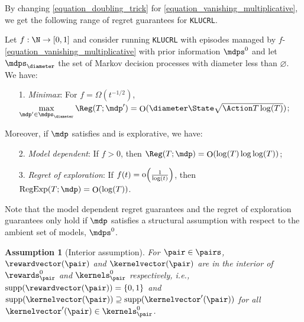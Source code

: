 \documentclass[preprint,cleveref,12pt]{colt2025}
\newenvironment{blackblock}{
    \begin{tcolorbox}[
        enhanced,
        breakable,
        colback=black!10,
        leftrule=1mm,
        toprule=0pt,
        bottomrule=0pt,
        rightrule=0pt,
        arc=0pt,
        before skip=1em plus 2pt,
        after skip=1em plus 2pt,
    ]
}{
    \end{tcolorbox}
}
\newtheorem{assumption}{Assumption}
\DeclarePairedDelimiter{\braces}{\{}{\}}	%
\DeclarePairedDelimiter{\parens}{(}{)}	%
\DeclareMathOperator*{\oh}{\mathrm{o}}
\DeclareMathOperator*{\OH}{\mathrm{O}}
\def\model{\mdp}
\def\models{\mdps}
\def\kernel{\kernelvector}
\def\reward{\rewardvector}
\DeclareMathOperator{\RegExp}{\mathrm{RegExp}}
\begin{document}
    By changing \eqref{equation_doubling_trick} for \eqref{equation_vanishing_multiplicative}, we get the following range of regret guarantees for \texttt{KLUCRL}.

    \begin{blackblock}
    \begin{theorem}
    \label{theorem_main}
        Let $f : \N \to [0, 1]$ and consider running \texttt{KLUCRL} with episodes managed by $f$-\eqref{equation_vanishing_multiplicative} with prior information $\models^0$ and let $\models_\diameter$ the set of Markov decision processes with diameter less than $\diameter$. 
        We have:
        \begin{itemize}
            \item[1.] \emph{Minimax}: For $f = \Omega(t^{-1/2})$, $\displaystyle \max_{\model' \in \models_\diameter} \Reg(T; \model') = \textstyle \OH(\diameter \State \sqrt{\Action T \log(T)})$; 
        \end{itemize}
        Moreover, if $\model$ satisfies  and is explorative, we have:
        \begin{itemize}
            \item[2.] \emph{Model dependent}: If $f > 0$, then $\Reg(T; \model) = \OH(\log(T)\log\log(T))$;
            \vspace{-1em}
            \item[3.] \emph{Regret of exploration}: If $f(t) = \oh\parens*{\frac 1{\log(t)}}$, then $\RegExp(T; \model) = \OH(\log(T))$.

        \end{itemize}
    \end{theorem}
    \end{blackblock}

    Note that the model dependent regret guarantees and the regret of exploration guarantees only hold if $\model$ satisfies a structural assumption with respect to the ambient set of models, $\models^0$. 

    \begin{assumption}[Interior assumption]
    \label{assumption_interior}
        For $\pair \in \pairs$, $\reward(\pair)$ and $\kernel(\pair)$ are in the interior of $\rewards_\pair^0$ and $\kernels_\pair^0$ respectively, i.e., $\mathrm{supp}(\reward(\pair)) = \braces{0, 1}$ and $\mathrm{supp}(\kernel(\pair)) \supseteq \mathrm{supp}(\kernel'(\pair))$ for all $\kernel'(\pair) \in \kernels_\pair^0$. 
    \end{assumption}
\end{document}

